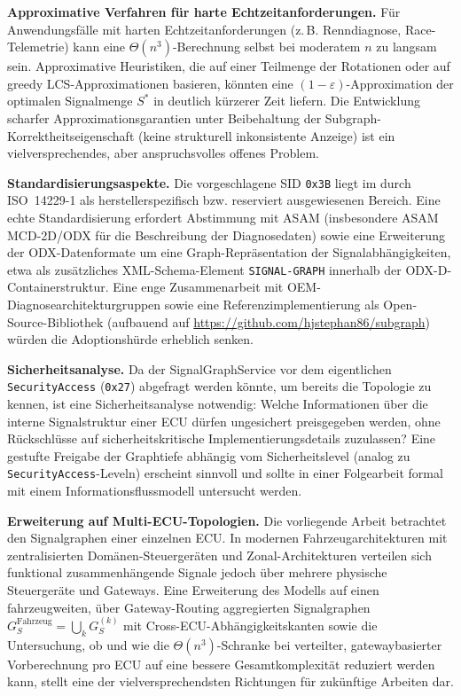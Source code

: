 ﻿\documentclass[a4paper,12pt]{article}
\theoremstyle{definition}
\begin{document}
\textbf{Approximative Verfahren für harte Echtzeitanforderungen.} Für Anwendungsfälle mit harten Echtzeitanforderungen (z.\,B. Renndiagnose, Race-Telemetrie) kann eine $\Theta(n^3)$-Berechnung selbst bei moderatem $n$ zu langsam sein. Approximative Heuristiken, die auf einer Teilmenge der Rotationen oder auf greedy LCS-Approximationen basieren, könnten eine $(1-\varepsilon)$-Approximation der optimalen Signalmenge $S^\ast$ in deutlich kürzerer Zeit liefern. Die Entwicklung scharfer Approximationsgarantien unter Beibehaltung der Subgraph-Korrektheitseigenschaft (keine strukturell inkonsistente Anzeige) ist ein vielversprechendes, aber anspruchsvolles offenes Problem.

\textbf{Standardisierungsaspekte.} Die vorgeschlagene SID \texttt{0x3B} liegt im durch ISO~14229-1 als herstellerspezifisch bzw. reserviert ausgewiesenen Bereich. Eine echte Standardisierung erfordert Abstimmung mit ASAM (insbesondere ASAM MCD-2D/ODX für die Beschreibung der Diagnosedaten) sowie eine Erweiterung der ODX-Datenformate um eine Graph-Repräsentation der Signalabhängigkeiten, etwa als zusätzliches XML-Schema-Element \texttt{SIGNAL-GRAPH} innerhalb der ODX-D-Containerstruktur. Eine enge Zusammenarbeit mit OEM-Diagnosearchitekturgruppen sowie eine Referenzimplementierung als Open-Source-Bibliothek (aufbauend auf \url{https://github.com/hjstephan86/subgraph}) würden die Adoptionshürde erheblich senken.

\textbf{Sicherheitsanalyse.} Da der SignalGraphService vor dem eigentlichen \texttt{SecurityAccess} (\texttt{0x27}) abgefragt werden könnte, um bereits die Topologie zu kennen, ist eine Sicherheitsanalyse notwendig: Welche Informationen über die interne Signalstruktur einer ECU dürfen ungesichert preisgegeben werden, ohne Rückschlüsse auf sicherheitskritische Implementierungsdetails zuzulassen? Eine gestufte Freigabe der Graphtiefe abhängig vom Sicherheitslevel (analog zu \texttt{SecurityAccess}-Leveln) erscheint sinnvoll und sollte in einer Folgearbeit formal mit einem Informationsflussmodell untersucht werden.

\textbf{Erweiterung auf Multi-ECU-Topologien.} Die vorliegende Arbeit betrachtet den Signalgraphen einer einzelnen ECU. In modernen Fahrzeugarchitekturen mit zentralisierten Domänen-Steuergeräten und Zonal-Architekturen verteilen sich funktional zusammenhängende Signale jedoch über mehrere physische Steuergeräte und Gateways. Eine Erweiterung des Modells auf einen fahrzeugweiten, über Gateway-Routing aggregierten Signalgraphen $G_S^{\text{Fahrzeug}} = \bigcup_k G_S^{(k)}$ mit Cross-ECU-Abhängigkeitskanten sowie die Untersuchung, ob und wie die $\Theta(n^3)$-Schranke bei verteilter, gatewaybasierter Vorberechnung pro ECU auf eine bessere Gesamtkomplexität reduziert werden kann, stellt eine der vielversprechendsten Richtungen für zukünftige Arbeiten dar.
\end{document}
